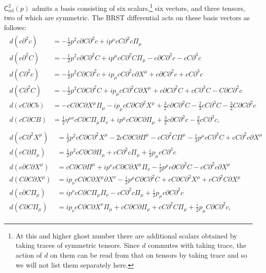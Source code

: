 \documentclass[11pt,reqno,a4paper,final]{amsart}
\theoremstyle{plain}
\theoremstyle{definition}
\renewcommand{\d}{\partial}
\newcommand{\Crel}{\mathsf{C}_{\mathrm{rel}}} %
\newcommand{\1}{\mathbb{1}}
\numberwithin{equation}{section}
\begin{document}
\begin{appendices}
$\Crel^2(p)$ admits a basis consisting of six scalars,\footnote{At this and higher
  ghost number there are additional scalars obtained by taking traces
  of symmetric tensors.  Since $d$ commutes with taking trace, the
  action of $d$ on them can be read from that on tensors by taking
  trace and so we will not list them separately here.} six vectors, and three tensors, two of which are symmetric. The BRST differential acts on these basis vectors as follows:
\begin{align}
    \begin{split} \label{eq:d-on-scalars-gh-no-2}
    d (c \d^2 c) &= -\tfrac12 p^2 c \d C \d^2 c + i p^\mu c C \d^2 c \Pi_\mu\\
    d (c \d^2 C) &= -\tfrac12 p^2 c \d C \d^2 C + i p^\mu c C \d^2 C \Pi_\mu - c\d C \d^2c - c C \d^3c\\
    d (C \d^2 c) &= -\tfrac12 p^2 C \d C \d^2 c + i p_\mu c C \d^2 c \d X^\mu + c \d C \d^2 c + c C \d^3 c\\
    d (C \d^2 C) &= -\tfrac12 p^2 C \d C \d^2 C + i p_\mu c C \d^2 C \d X^\mu + c \d C \d^2 C + c C \d^3 C - C \d C \d^2 c\\
    d (c C \d C b) &= -c C \d C \d X^\mu \Pi_\mu - i p_\mu c C \d C \d^2X^\mu + \tfrac32 c \d C \d^2 C - \tfrac23 c C \d^3C - \tfrac32 C \d C \d^2 c\\
    d (c C \d C B) &= \tfrac12 \eta^{\mu\nu} c C \d C \Pi_\mu \Pi_\nu + i p^\mu c C \d C \d\Pi_\mu + \tfrac32 c \d C \d^2 c - \tfrac23 c C \d^3 c,
  \end{split}\\[1ex]
  \begin{split} \label{eq:d-on-vectors-gh-no-2}
    d ( c C \d^2 X^\mu) &= \tfrac12 p^2 c C \d C \d^2 X^\mu - 2 c C \d C \d \Pi^\mu - c C \d^2 C \Pi^\mu - \tfrac{i}3 p^\mu c C \d^3 C + c C \d^2 c \d X^\mu\\
    d ( c C \d \Pi_\mu) &= \tfrac12 p^2 c C \d C \d \Pi_\mu + c C \d^2 c \Pi_\mu + \tfrac{i}3 p_\mu c C \d^3 c\\
    d ( c \d C \d X^\mu) &=  c C \d C \d \Pi^\mu + i p^\nu c C \d C \d X^\mu \Pi_\nu - \tfrac{i}2 p^\mu c \d C \d^2 C - c C \d^2 c \d X^\mu\\
    d ( C \d C \d X^\mu) &= i p_\nu c C \d C \d X^\mu \d X^\nu - \tfrac{i}2 p^\mu C \d C \d^2 C + c C \d C \d^2 X^\mu + c C \d^2 C \d X^\mu\\
    d ( c \d C \Pi_\mu) &= i p^\nu c  C \d C \Pi_\mu \Pi_\nu - c C \d^2 c \Pi_\mu + \tfrac{i}2 p_\mu c \d C \d^2 c\\
    d ( C \d C \Pi_\mu) &= i p_\nu c C \d C \d X^\nu \Pi_\mu + c C \d C \d \Pi_\mu + c C \d^2 C \Pi_\mu + \tfrac{i}2 p_\mu C \d C \d^2 c,

\end{split}
\end{align}
\end{appendices}
\end{document}
